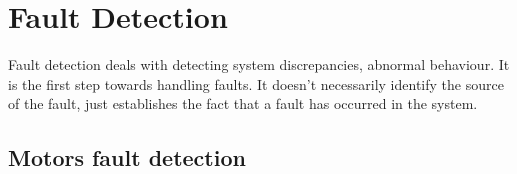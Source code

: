 \chapter{Fault Detection}

Fault detection deals with detecting system discrepancies, abnormal behaviour. It is the first step towards handling faults. It doesn't necessarily identify the source of the fault, just establishes the fact that a fault has occurred in the system.


\section{Motors fault detection}


